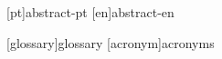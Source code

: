 %
%
%
%
[pt]{abstract-pt}  %
[en]{abstract-en}  %



%
%
%
[glossary]{glossary}
[acronym]{acronyms}




